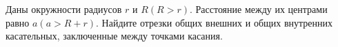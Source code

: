 \begin{ex}
	\begin{condition}
		Даны окружности радиусов \( r  \) и \( R (R > r) \). Расстояние	между их центрами равно \( a (a > R+r) \). Найдите отрезки общих внешних и общих внутренних касательных, заключенные между точками касания.
	\end{condition}
\end{ex}
